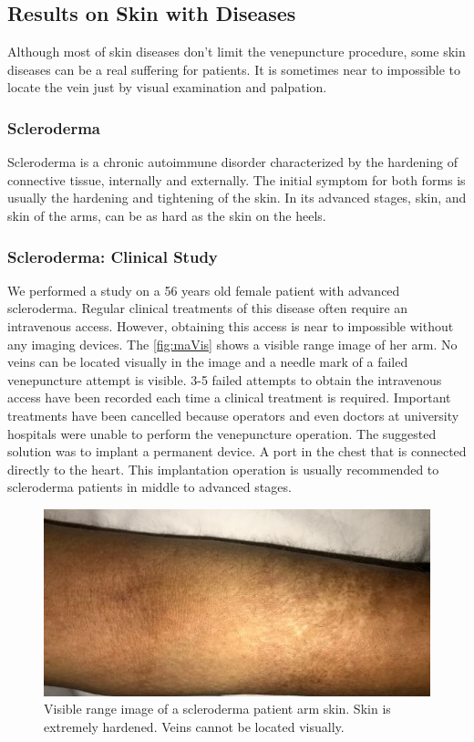 \subsection{Results on Skin with Diseases}

Although most of skin diseases don’t limit the venepuncture procedure, some skin diseases can be a real suffering for patients. It is sometimes near to impossible to locate the vein just by visual examination and palpation.

\subsubsection{Scleroderma}
Scleroderma is a chronic autoimmune disorder characterized by the hardening of connective tissue, internally and externally. The initial symptom for both forms is usually the hardening and tightening of the skin. In its advanced stages, skin, and skin of the arms, can be as hard as the skin on the heels. 

\subsubsection{Scleroderma: Clinical Study}
We performed a study on a 56 years old female patient with advanced scleroderma. Regular clinical treatments of this disease often require an intravenous access. However, obtaining this access is near to impossible without any imaging devices. The \autoref{fig:maVis} shows a visible range image of her arm. No veins can be located visually in the image and a needle mark of a failed venepuncture attempt is visible. 3-5 failed attempts to obtain the intravenous access have been recorded each time a clinical treatment is required. Important treatments have been cancelled because operators and even doctors at university hospitals were unable to perform the venepuncture operation. The suggested solution was to implant a permanent device. A port in the chest that is connected directly to the heart. This implantation operation is usually recommended to scleroderma patients in middle to advanced stages.


\begin{figure}[H]
\centering
\includegraphics[scale=0.8]{figures/maVis.JPG}
\caption[Visible range image of a scleroderma patient arm skin]{Visible range image of a scleroderma patient arm skin. Skin is extremely hardened. Veins cannot be located visually.}\label{fig:maVis}
\end{figure}


